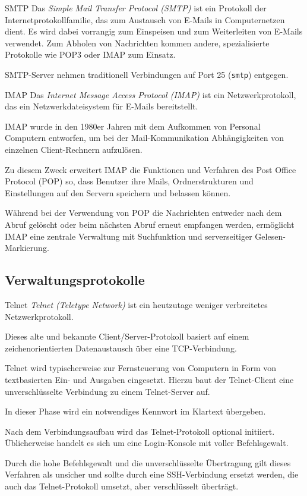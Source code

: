 \begin{bonus}{SMTP}
    Das \emph{Simple Mail Transfer Protocol (SMTP)}  ist ein Protokoll der Internetprotokollfamilie, das zum Austausch von E-Mails in Computernetzen dient. Es wird dabei vorrangig zum Einspeisen und zum Weiterleiten von E-Mails verwendet. Zum Abholen von Nachrichten kommen andere, spezialisierte Protokolle wie POP3 oder IMAP zum Einsatz.

    SMTP-Server nehmen traditionell Verbindungen auf Port 25 (\texttt{smtp}) entgegen.
\end{bonus}

\begin{bonus}{IMAP}
    Das \emph{Internet Message Access Protocol (IMAP)} ist ein Netzwerkprotokoll, das ein Netzwerkdateisystem für E-Mails bereitstellt.

    IMAP wurde in den 1980er Jahren mit dem Aufkommen von Personal Computern entworfen, um bei der Mail-Kommunikation Abhängigkeiten von einzelnen Client-Rechnern aufzulösen.

    Zu diesem Zweck erweitert IMAP die Funktionen und Verfahren des Post Office Protocol (POP) so, dass Benutzer ihre Mails, Ordnerstrukturen und Einstellungen auf den Servern speichern und belassen können.

    Während bei der Verwendung von POP die Nachrichten entweder nach dem Abruf gelöscht oder beim nächsten Abruf erneut empfangen werden, ermöglicht IMAP eine zentrale Verwaltung mit Suchfunktion und serverseitiger Gelesen-Markierung.
\end{bonus}

\subsection{Verwaltungsprotokolle}

\begin{bonus}{Telnet}
    \emph{Telnet (Teletype Network)} ist ein heutzutage weniger verbreitetes Netzwerkprotokoll.

    Dieses alte und bekannte Client/Server-Protokoll basiert auf einem zeichenorientierten Datenaustausch über eine TCP-Verbindung.

    Telnet wird typischerweise zur Fernsteuerung von Computern in Form von textbasierten Ein- und Ausgaben eingesetzt.
    Hierzu baut der Telnet-Client eine unverschlüsselte Verbindung zu einem Telnet-Server auf.

    In dieser Phase wird ein notwendiges Kennwort im Klartext übergeben.

    Nach dem Verbindungsaufbau wird das Telnet-Protokoll optional initiiert.
    Üblicherweise handelt es sich um eine Login-Konsole mit voller Befehlsgewalt.

    Durch die hohe Befehlsgewalt und die unverschlüsselte Übertragung gilt dieses Verfahren als unsicher und sollte durch eine SSH-Verbindung ersetzt werden, die auch das Telnet-Protokoll umsetzt, aber verschlüsselt überträgt.
\end{bonus}

